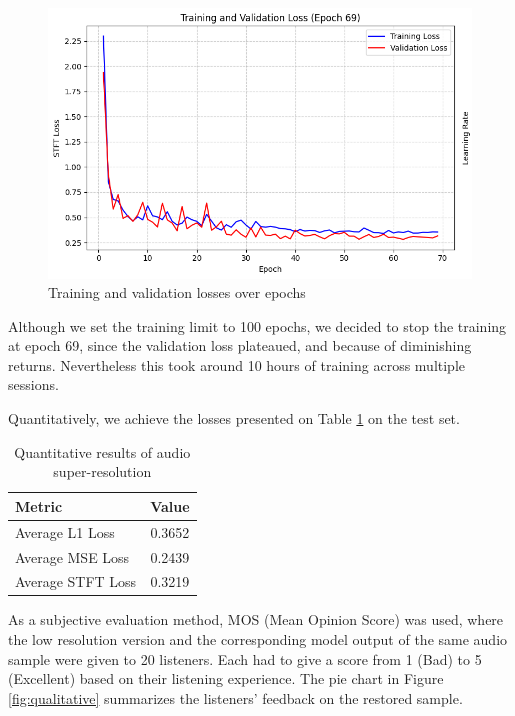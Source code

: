\documentclass{article}
\begin{document}
\begin{figure}[!htb]
    \centering
    \includegraphics[width=1\linewidth]{images/training1.png}
    \vspace{-0.7cm} %
    \caption{Training and validation losses over epochs}
    \label{fig:training1}
\end{figure}

Although we set the training limit to 100 epochs, we decided to stop the training at epoch 69, since the validation loss plateaued, and because of diminishing returns.
Nevertheless this took around 10 hours of training across multiple sessions.

Quantitatively, we achieve the losses presented on Table \ref{tab:results1} on the test set.

\begin{table}[!htb]
    \centering
    \begin{tabular}{lc}
        \toprule
        \textbf{Metric} & \textbf{Value} \\
        \midrule
        Average L1 Loss & 0.3652 \\
        Average MSE Loss & 0.2439 \\
        Average STFT Loss & 0.3219 \\
        \bottomrule
    \end{tabular}
    \caption{Quantitative results of audio super-resolution}
    \label{tab:results1}
\end{table}

As a subjective evaluation method, MOS (Mean Opinion Score) was used, where the low resolution version and the corresponding model output of the same audio sample were given to 20 listeners.
Each had to give a score from 1 (Bad) to 5 (Excellent) based on their listening experience.
The pie chart in Figure \ref{fig:qualitative} summarizes the listeners' feedback on the restored sample.
\end{document}
